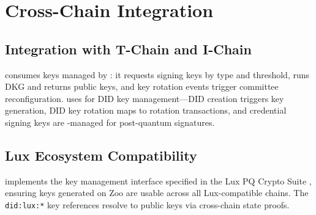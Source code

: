 \section{Cross-Chain Integration}


\subsection{Integration with T-Chain and I-Chain}

\TChain{} \cite{zoo-threshold-signatures} consumes keys managed by \KChain{}: it requests signing keys by type and threshold, \KChain{} runs DKG and returns public keys, and key rotation events trigger committee reconfiguration. \IChain{} \cite{zoo-identity-chain} uses \KChain{} for DID key management---DID creation triggers key generation, DID key rotation maps to \KChain{} rotation transactions, and credential signing keys are \KChain{}-managed for post-quantum signatures.

\subsection{Lux Ecosystem Compatibility}

\KChain{} implements the key management interface specified in the Lux PQ Crypto Suite \cite{lux-pq-crypto-suite}, ensuring keys generated on Zoo are usable across all Lux-compatible chains. The \texttt{did:lux:*} key references resolve to \KChain{} public keys via cross-chain state proofs.

